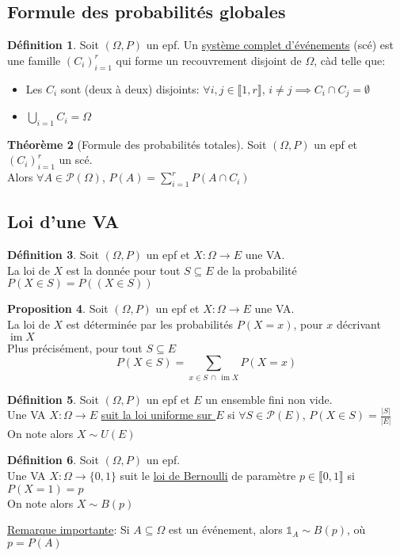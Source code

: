 \documentclass[10pt,a4paper]{article}
\theoremstyle{definition}
\newtheorem{proposition}{Proposition}[section]
\newtheorem{theorem}[proposition]{Théorème}
\newtheorem{definition}[proposition]{Définition}
\DeclareMathOperator{\im}{im}
\begin{document}
\subsection{Formule des probabilités globales}
\begin{definition}
Soit $(\Omega, P)$ un epf.
Un \uline{système complet d'événements} (scé) est une famille $(C_i)_{i = 1}^r$ qui forme un recouvrement disjoint de $\Omega$, càd telle que:
\begin{itemize}
\item Les $C_i$ sont (deux à deux) disjoints: $\forall i, j \in \llbracket 1, r \rrbracket$, $i \neq j \implies C_i \cap C_j = \emptyset$
\item $\bigcup\limits_{i = 1} C_i = \Omega$
\end{itemize}
\end{definition}
\begin{theorem}[Formule des probabilités totales]
Soit $(\Omega, P)$ un epf et $(C_i)_{i = 1}^r$ un scé. \\
Alors $\forall A \in \mathcal{P}(\Omega)$, $P(A) = \sum\limits_{i = 1}^r P(A \cap C_i)$
\end{theorem}

\subsection{Loi d'une VA}
\begin{definition}
Soit $(\Omega, P)$ un epf et $X: \Omega \to E$ une VA. \\
La loi de $X$ est la donnée pour tout $S \subseteq E$ de la probabilité $P(X \in S) = P( (X \in S) )$
\end{definition}
\begin{proposition}
Soit $(\Omega, P)$ un epf et $X: \Omega \to E$ une VA. \\
La loi de $X$ est déterminée par les probabilités $P(X = x)$, pour $x$ décrivant $\im X$ \\
Plus précisément, pour tout $S \subseteq E$
\[P(X \in S) = \sum\limits_{x \in S \, \cap \, \im X} P(X = x)\]
\end{proposition}
\begin{definition}
Soit $(\Omega, P)$ un epf et $E$ un ensemble fini non vide. \\
Une VA $X: \Omega \to E$ \uline{suit la loi uniforme sur $E$} si $\forall S \in \mathcal{P}(E)$, $P(X \in S) = \frac{\left| S \right|}{\left| E \right|}$ \\
On note alors $X \sim U(E)$
\end{definition}
\begin{definition}
Soit $(\Omega, P)$ un epf. \\
Une VA $X: \Omega \to \{ 0, 1 \}$ suit le \uline{loi de Bernoulli} de paramètre $p \in \llbracket 0, 1 \rrbracket$ si $P(X = 1) = p$ \\
On note alors $X \sim B(p)$
\end{definition}
\noindent \uline{Remarque importante}: Si $A \subseteq \Omega$ est un événement, alors $\mathds{1}_A \sim B(p)$, où $p = P(A)$
\end{document}
